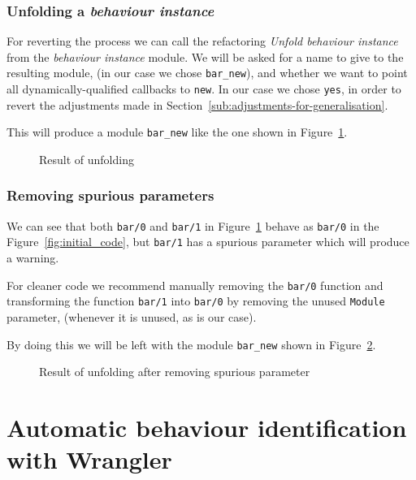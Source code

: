 \subsubsection{Unfolding a \emph{behaviour instance}}

For reverting the process we can call the refactoring \emph{Unfold
behaviour instance} from the \emph{behaviour instance} module. We
will be asked for a name to give to the resulting module, (in our
case we chose \texttt{bar\_new}), and whether we want to point all
dynamically-qualified callbacks to \texttt{new}. In our case we chose
\texttt{yes}, in order to revert the adjustments made in 
Section~\ref{sub:adjustments-for-generalisation}.

This will produce a module \texttt{bar\_new} like the one shown in
Figure~\ref{fig:unfold_result}.

\begin{figure}

\caption{Result of unfolding\label{fig:unfold_result}}
\end{figure}



\subsubsection{Removing spurious parameters}

We can see that both \texttt{bar/0} and \texttt{bar/1} in 
Figure~\ref{fig:unfold_result}
behave as \texttt{bar/0} in the Figure~\ref{fig:initial_code}, but
\texttt{bar/1} has a spurious parameter which will produce a warning.

For cleaner code we recommend manually removing the \texttt{bar/0}
function and transforming the function \texttt{bar/1} into \texttt{bar/0}
by removing the unused \texttt{Module} parameter, (whenever it is
unused, as is our case).

By doing this we will be left with the module \texttt{bar\_new} shown
in Figure~\ref{fig:final_result}.

\begin{figure}

\caption{Result of unfolding after removing spurious 
parameter\label{fig:final_result}}
\end{figure}

\section{Automatic behaviour identification with Wrangler}
\label{sec:identification}


